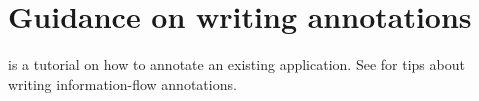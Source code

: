 \section{Guidance on writing annotations}
 is a tutorial on how to annotate an existing application. 
See  for tips about
writing information-flow annotations. 








